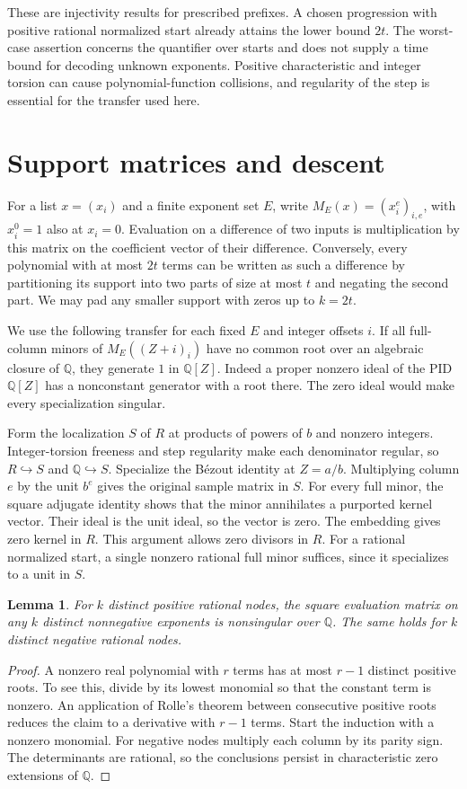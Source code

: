 \documentclass[10pt]{article}
\newtheorem{lemma}[theorem]{Lemma}
\newcommand{\Q}{\mathbb Q}
\begin{document}
These are injectivity results for prescribed prefixes. A chosen progression
with positive rational normalized start already attains the lower bound
$2t$. The worst-case assertion concerns the quantifier over starts and
does not supply a time bound for decoding unknown exponents. Positive
characteristic and integer torsion can cause polynomial-function
collisions, and regularity of the step is essential for the transfer used
here.

\section{Support matrices and descent}\label{sec:descent}
For a list $x=(x_i)$ and a finite exponent set $E$, write
$M_E(x)=(x_i^e)_{i,e}$, with $x_i^0=1$ also at $x_i=0$. Evaluation
on a difference of two inputs is multiplication by this matrix on the
coefficient vector of their difference. Conversely, every polynomial with
at most $2t$ terms can be written as such a difference by partitioning its
support into two parts of size at most $t$ and negating the second part.
We may pad any smaller support with zeros up to $k=2t$.

We use the following transfer for each fixed $E$ and integer offsets $i$.
If all full-column minors of $M_E((Z+i)_i)$ have no common root over an
algebraic closure of $\Q$, they generate $1$ in $\Q[Z]$. Indeed a proper
nonzero ideal of the PID $\Q[Z]$ has a nonconstant generator with a root
there. The zero ideal would make every specialization singular.

Form the localization $S$ of $R$ at products of powers of $b$ and
nonzero integers. Integer-torsion freeness and step regularity make each
denominator regular, so $R\hookrightarrow S$ and $\Q\hookrightarrow S$.
Specialize the B\'ezout identity at $Z=a/b$. Multiplying column $e$ by the
unit $b^e$ gives the original sample matrix in $S$. For every full minor,
the square adjugate identity shows that the minor annihilates a purported
kernel vector. Their ideal is the unit ideal, so the vector is zero.
The embedding gives zero kernel in $R$. This argument allows zero
divisors in $R$. For a rational normalized start, a single nonzero
rational full minor suffices, since it specializes to a unit in $S$.

\begin{lemma}\label{lem:sign}
For $k$ distinct positive rational nodes, the square evaluation matrix on
any $k$ distinct nonnegative exponents is nonsingular over $\Q$.
The same holds for $k$ distinct negative rational nodes.
\end{lemma}
\begin{proof}
A nonzero real polynomial with $r$ terms has at most $r-1$ distinct
positive roots. To see this, divide by its lowest monomial so that the
constant term is nonzero. An application of Rolle's theorem between
consecutive positive roots reduces the claim to a derivative with
$r-1$ terms. Start the induction with a nonzero monomial.
For negative nodes multiply each column by its parity sign. The
determinants are rational, so the conclusions persist in characteristic
zero extensions of $\Q$.
\end{proof}
\end{document}
